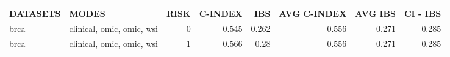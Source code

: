 \begin{tabular}{llrrrrrr}
\hline
 DATASETS   & MODES                     &   RISK &   C-INDEX &   IBS &   AVG C-INDEX &   AVG IBS &   CI - IBS \\
\hline
 brca       & clinical, omic, omic, wsi &      0 &     0.545 & 0.262 &         0.556 &     0.271 &      0.285 \\
 brca       & clinical, omic, omic, wsi &      1 &     0.566 & 0.28  &         0.556 &     0.271 &      0.285 \\
\hline
\end{tabular}